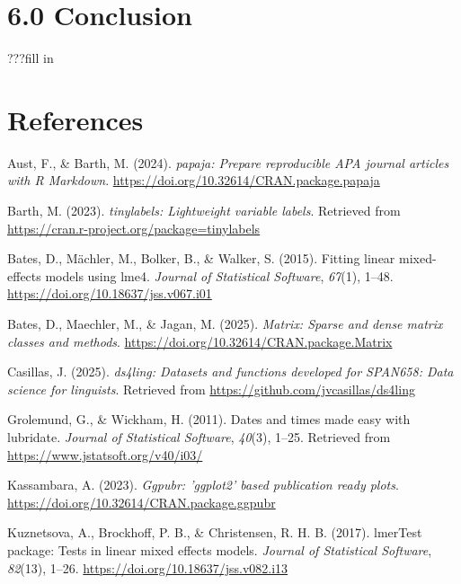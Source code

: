 \documentclass[
  ,man,floatsintext]{apa6}
\newlength{\cslhangindent}
\newenvironment{CSLReferences}[2] %
 {\begin{list}{}{%
  \setlength{\itemindent}{0pt}
  \setlength{\leftmargin}{0pt}
  \setlength{\parsep}{0pt}
  \ifodd #1
   \setlength{\leftmargin}{\cslhangindent}
   \setlength{\itemindent}{-1\cslhangindent}
  \fi
  \setlength{\itemsep}{#2\baselineskip}}}
 {\end{list}}
\begin{document}
\section{6.0 Conclusion}\label{conclusion}

???fill in

\section{References}\label{references}

\setlength{\parindent}{-0.5in}
\setlength{\leftskip}{0.5in}

\label{refs}
\begin{CSLReferences}{1}{0}
Aust, F., \& Barth, M. (2024). \emph{{papaja}: {Prepare} reproducible {APA} journal articles with {R Markdown}}. \url{https://doi.org/10.32614/CRAN.package.papaja}

Barth, M. (2023). \emph{{tinylabels}: Lightweight variable labels}. Retrieved from \url{https://cran.r-project.org/package=tinylabels}

Bates, D., Mächler, M., Bolker, B., \& Walker, S. (2015). Fitting linear mixed-effects models using {lme4}. \emph{Journal of Statistical Software}, \emph{67}(1), 1--48. \url{https://doi.org/10.18637/jss.v067.i01}

Bates, D., Maechler, M., \& Jagan, M. (2025). \emph{Matrix: Sparse and dense matrix classes and methods}. \url{https://doi.org/10.32614/CRAN.package.Matrix}

Casillas, J. (2025). \emph{ds4ling: Datasets and functions developed for SPAN658: Data science for linguists}. Retrieved from \url{https://github.com/jvcasillas/ds4ling}

Grolemund, G., \& Wickham, H. (2011). Dates and times made easy with {lubridate}. \emph{Journal of Statistical Software}, \emph{40}(3), 1--25. Retrieved from \url{https://www.jstatsoft.org/v40/i03/}

Kassambara, A. (2023). \emph{Ggpubr: 'ggplot2' based publication ready plots}. \url{https://doi.org/10.32614/CRAN.package.ggpubr}

Kuznetsova, A., Brockhoff, P. B., \& Christensen, R. H. B. (2017). {lmerTest} package: Tests in linear mixed effects models. \emph{Journal of Statistical Software}, \emph{82}(13), 1--26. \url{https://doi.org/10.18637/jss.v082.i13}


\end{CSLReferences}
\end{document}
